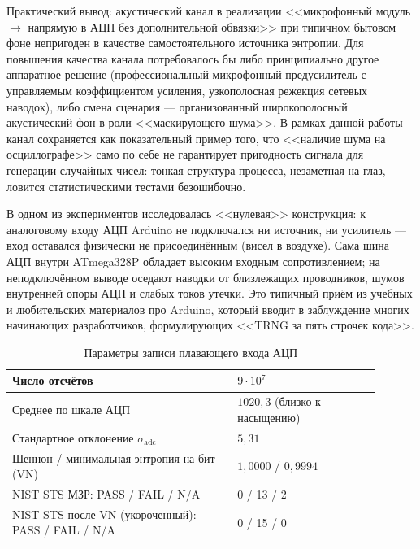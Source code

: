 Практический вывод: акустический канал в реализации <<микрофонный модуль
$\to$ напрямую в АЦП без дополнительной обвязки>> при типичном бытовом
фоне непригоден в качестве самостоятельного источника энтропии. Для
повышения качества канала потребовалось бы либо принципиально другое
аппаратное решение (профессиональный микрофонный предусилитель с управляемым
коэффициентом усиления, узкополосная режекция сетевых наводок), либо смена
сценария --- организованный широкополосный акустический фон в роли
<<маскирующего шума>>. В рамках данной работы канал сохраняется как
показательный пример того, что <<наличие шума на осциллографе>> само по себе
не гарантирует пригодность сигнала для генерации случайных чисел: тонкая
структура процесса, незаметная на глаз, ловится статистическими тестами
безошибочно.


В одном из экспериментов исследовалась <<нулевая>> конструкция: к аналоговому входу
АЦП Arduino не подключался ни источник, ни усилитель --- вход оставался физически
не присоединённым (висел в воздухе). Сама шина АЦП внутри ATmega328P обладает высоким
входным сопротивлением; на неподключённом выводе оседают наводки от близлежащих
проводников, шумов внутренней опоры АЦП и слабых токов утечки. Это типичный приём
из учебных и любительских материалов про Arduino, который вводит в заблуждение
многих начинающих разработчиков, формулирующих <<TRNG за пять строчек кода>>.

\begin{table}[H]
  \centering
  \footnotesize
  \caption{Параметры записи плавающего входа АЦП}
  \label{tab:floating_summary}
  \begin{tabular}{|p{0.55\linewidth}|p{0.35\linewidth}|}
    \hline
    Число отсчётов & $9\cdot 10^7$ \\
    \hline
    Среднее по шкале АЦП & $1020{,}3$ (близко к насыщению) \\
    \hline
    Стандартное отклонение $\sigma_\mathrm{adc}$ & $5{,}31$ \\
    \hline
    Шеннон / минимальная энтропия на бит (VN) & $1{,}0000$ / $0{,}9994$ \\
    \hline
    NIST STS МЗР: PASS / FAIL / N/A & 0 / 13 / 2 \\
    \hline
    NIST STS после VN (укороченный): PASS / FAIL / N/A & 0 / 15 / 0 \\
    \hline
  \end{tabular}
\end{table}

